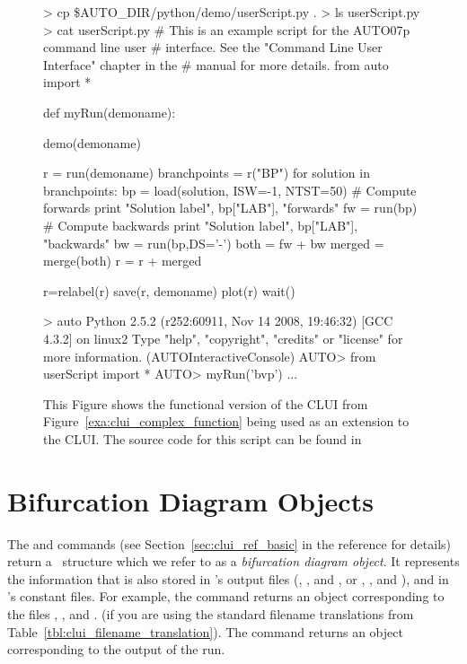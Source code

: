 \documentclass[12pt]{report}
\begin{document}
 \begin{figure}[htbp]
 {\small \begin{center} \begin{boxedverbatim}
 > cp \$AUTO\_DIR/python/demo/userScript.py .
 > ls
 userScript.py
 > cat userScript.py
 # This is an example script for the AUTO07p command line user
 # interface.  See the "Command Line User Interface" chapter in the
 # manual for more details.
 from auto import *

 def myRun(demoname):

     demo(demoname)

     r = run(demoname)
     branchpoints = r("BP")
     for solution in branchpoints:
         bp = load(solution, ISW=-1, NTST=50)
         # Compute forwards
         print "Solution label", bp["LAB"], "forwards"
         fw = run(bp)
         # Compute backwards
         print "Solution label", bp["LAB"], "backwards"
         bw = run(bp,DS='-')
         both = fw + bw
         merged = merge(both)
         r = r + merged

     r=relabel(r)
     save(r, demoname)
     plot(r)
     wait()

 > auto
 Python 2.5.2 (r252:60911, Nov 14 2008, 19:46:32) 
 [GCC 4.3.2] on linux2
 Type "help", "copyright", "credits" or "license" for more information.
 (AUTOInteractiveConsole)
 AUTO> from userScript import *
 AUTO> myRun('bvp')
 ...
 \end{boxedverbatim}
 \end{center} 
 }
 \caption[An example of using a user created function interactively.]
 {This Figure shows the functional version of the
  \AUTO CLUI from Figure~\ref{exa:clui_complex_function} being 
 used as an extension to the \AUTO CLUI.  The source
 code for this script can be found in 
 }
 \label{exa:clui_complex_interactive}
 \end{figure}

 \section{ Bifurcation Diagram Objects}
 The  and  commands (see
 Section~\ref{sec:clui_ref_basic} in the reference for details)
 return a ~\python structure which we refer to as a \emph{bifurcation
 diagram object}. It represents the information that is also stored
 in \AUTO's output files (, ,
 and , or , , and ),
 and in \AUTO's constant files.
 For example, the command 
 returns an object corresponding to the files ,
 , and .
 (if you are using the standard
 filename translations from Table~\ref{tbl:clui_filename_translation}).
 The command  returns
 an object corresponding to the output of the run.
\end{document}
